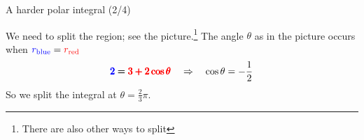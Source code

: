 \begin{frame}{A harder polar integral (2/4)}
\begin{minipage}{0.45\textwidth}
%
            \end{minipage}\begin{minipage}{0.45\textwidth}
                \pause We need to split the region; see the picture.\footnote{There are also other ways to split} The angle $\theta$ as in the picture occurs when $\textcolor{blue}{r_{\text{blue}}}=\textcolor{red}{r_{\text{red}}}$ \[\pmb{\textcolor{blue}{2}=\textcolor{red}{3+2\cos\theta}}\quad\Rightarrow\quad\cos\theta=-\frac{1}{2}\]
                \pause So we split the integral at $\theta=\frac{2}{3}\pi$.
                
            \end{minipage}
\end{frame}




